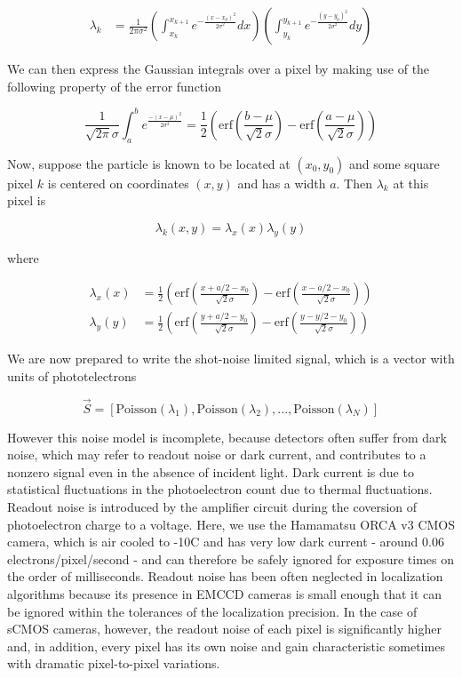 \documentclass{ucetd}
\begin{document}
\begin{align*}
\lambda_{k} &= \frac{1}{2\pi\sigma^{2}}\left(\int_{x_{k}}^{x_{k+1}}e^{-\frac{(x-x_{0})^{2}}{2\sigma^{2}}}dx\right)\left(\int_{y_{k}}^{y_{k+1}}e^{-\frac{(y-y_{0})^{2}}{2\sigma^{2}}}dy\right)
\end{align*}


We can then express the Gaussian integrals over a pixel by making use of the following property of the error function

\begin{equation*}
\frac{1}{\sqrt{2\pi}\sigma}\int_{a}^{b} e^{\frac{-(x-\mu)^{2}}{2\sigma^{2}}} = \frac{1}{2}\left(\mathrm{erf}\left(\frac{b-\mu}{\sqrt{2}\sigma}\right) -\mathrm{erf}\left(\frac{a-\mu}{\sqrt{2}\sigma}\right)\right)
\end{equation*}

Now, suppose the particle is known to be located at $(x_{0},y_{0})$ and some square pixel $k$ is centered on coordinates $(x,y)$ and has a width $a$. Then $\lambda_{k}$ at this pixel is

\begin{equation}
\lambda_{k}(x,y) = \lambda_{x}(x)\lambda_{y}(y)
\end{equation}

where

\begin{align*}
\lambda_{x}(x) &= \frac{1}{2}\left(\mathrm{erf}\left(\frac{x+a/2-x_{0}}{\sqrt{2}\sigma}\right) -\mathrm{erf}\left(\frac{x-a/2-x_{0}}{\sqrt{2}\sigma}\right)\right)\\
\lambda_{y}(y) &= \frac{1}{2}\left(\mathrm{erf}\left(\frac{y+a/2-y_{0}}{\sqrt{2}\sigma}\right) -\mathrm{erf}\left(\frac{y-y/2-y_{0}}{\sqrt{2}\sigma}\right)\right)
\end{align*}

We are now prepared to write the shot-noise limited signal, which is a vector with units of phototelectrons

\begin{equation}
\vec{S} = \left[\mathrm{Poisson}(\lambda_{1}), \mathrm{Poisson}(\lambda_{2}), ..., \mathrm{Poisson}(\lambda_{N})\right]
\end{equation}


However this noise model is incomplete, because detectors often suffer from dark noise, which may refer to readout noise or dark current, and contributes to a nonzero signal even in the absence of incident light. Dark current is due to statistical fluctuations in the photoelectron count due to thermal fluctuations. Readout noise is introduced by the amplifier circuit during the coversion of photoelectron charge to a voltage. Here, we use the Hamamatsu ORCA v3 CMOS camera, which is air cooled to -10C and has very low dark current - around 0.06 electrons/pixel/second - and can therefore be safely ignored for exposure times on the order of milliseconds. Readout noise has been often neglected in localization algorithms because its presence in EMCCD cameras is small enough that it can be ignored within the tolerances of the localization precision. In the case of sCMOS cameras, however, the readout noise of each pixel is significantly higher and, in addition, every pixel has its own noise and gain characteristic sometimes with dramatic pixel-to-pixel variations.
\end{document}
